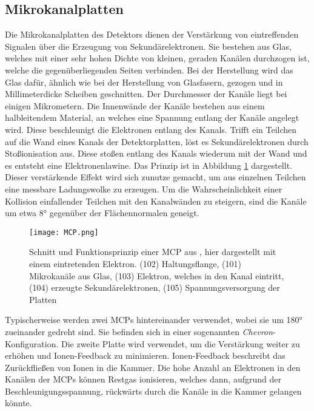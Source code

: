 \subsection{Mikrokanalplatten}
Die Mikrokanalplatten des Detektors dienen der Verstärkung von eintreffenden Signalen über die Erzeugung von Sekundärelektronen. Sie bestehen aus Glas, welches mit einer sehr hohen Dichte von kleinen, geraden Kanälen durchzogen ist, welche die gegenüberliegenden Seiten verbinden. Bei der Herstellung wird das Glas dafür, ähnlich wie bei der Herstellung von Glasfasern, gezogen und in Millimeterdicke Scheiben geschnitten. Der Durchmesser der Kanäle liegt bei einigen Mikrometern. Die Innenwände der Kanäle bestehen aus einem halbleitendem Material, an welches eine Spannung entlang der Kanäle angelegt wird. Diese beschleunigt die Elektronen entlang des Kanals. Trifft ein Teilchen auf die Wand eines Kanals der Detektorplatten, löst es Sekundärelektronen durch Stoßionisation aus. Diese stoßen entlang des Kanals wiederum mit der Wand und es entsteht eine Elektronenlawine. Das Prinzip ist in Abbildung \ref{fig:MCP} dargestellt. Dieser verstärkende Effekt wird sich zunutze gemacht, um aus einzelnen Teilchen eine messbare Ladungswolke zu erzeugen. Um die Wahrscheinlichkeit einer Kollision einfallender Teilchen mit den Kanalwänden zu steigern, sind die Kanäle um etwa \ang{8} gegenüber der Flächennormalen geneigt. 

\begin{figure}
    \centering
    \texttt{[image: MCP.png]}
    \caption[Schnitt und Funktionsprinzip einer MCP]{Schnitt und Funktionsprinzip einer MCP aus \cite{MCP}, hier dargestellt mit einem eintretenden Elektron. (102) Haltungsflange, (101) Mikrokanäle aus Glas, (103) Elektron, welches in den Kanal eintritt, (104) erzeugte Sekundärelektronen, (105) Spannungsversorgung der Platten}
    \label{fig:MCP} 
\end{figure}

Typischerweise werden zwei MCPs hintereinander verwendet, wobei sie um \ang{180} zueinander gedreht sind. Sie befinden sich in einer sogenannten \textit{Chevron}-Konfiguration. Die zweite Platte wird verwendet, um die Verstärkung weiter zu erhöhen und Ionen-Feedback zu minimieren. Ionen-Feedback beschreibt das Zurückfließen von Ionen in die Kammer. Die hohe Anzahl an Elektronen in den Kanälen der MCPs können Restgas ionisieren, welches dann, aufgrund der Beschleunigungsspannung, rückwärts durch die Kanäle in die Kammer gelangen könnte. 

